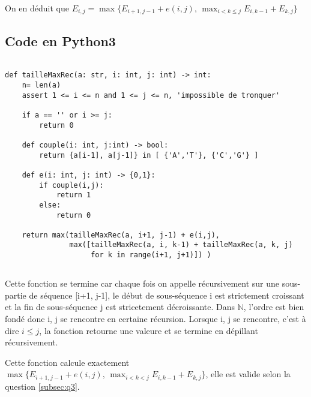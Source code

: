 \documentclass[french]{article}
\begin{document}
\begin{center}
On en déduit que $E_{i,j} =\max\{E_{i+1,j-1} + e(i,j), \,   \displaystyle \max_{i<k \leq j}  E_{i,k-1} + E_{k,j}\}$
\par\end{center}

\pagebreak
\subsection{Code en Python3}
\begin{lstlisting}[frame=single]  % Start your code-block

def tailleMaxRec(a: str, i: int, j: int) -> int:
    n= len(a)
    assert 1 <= i <= n and 1 <= j <= n, 'impossible de tronquer'
    
    if a == '' or i >= j:
        return 0

    def couple(i: int, j:int) -> bool:
        return {a[i-1], a[j-1]} in [ {'A','T'}, {'C','G'} ]
    
    def e(i: int, j: int) -> {0,1}:
        if couple(i,j):
            return 1
        else:
            return 0

    return max(tailleMaxRec(a, i+1, j-1) + e(i,j),
               max([tailleMaxRec(a, i, k-1) + tailleMaxRec(a, k, j)
                    for k in range(i+1, j+1)]) )
	\end{lstlisting}


\subsection{}
Cette fonction se termine car chaque fois on appelle récursivement sur une sous-partie de séquence [i+1, j-1], le début de sous-séquence i est strictement croissant et la fin de sous-séquence j est stricetement décroissante. Dans $\mathbb{N}$, l'ordre est bien fondé donc i, j se rencontre en certaine récursion. Lorsque i, j se rencontre, c'est à dire $i \leq j$, la fonction retourne une valeure et se termine en dépillant récursivement.
\par
Cette fonction calcule exactement $\max\{E_{i+1,j-1} + e(i,j), \,    \max_{i<k<j}  E_{i,k-1} + E_{k,j}\}$, elle est valide selon la question \ref{subsec:q3}.

\subsection{}
\end{document}
